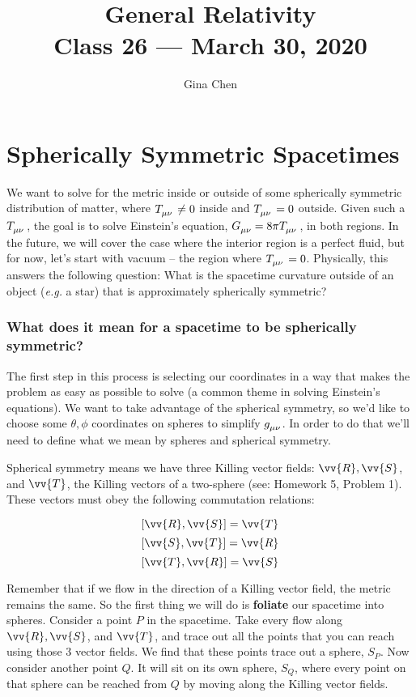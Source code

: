\documentclass[11pt,table]{article}
\title{{\Huge General Relativity}\\{\Large{Class 26 --- March 30, 2020}}} %
\author{Gina Chen}
\begin{document}
\maketitle
\flushbottom
\newpage
\pagestyle{fancynotes}

\part{Spherically Symmetric Spacetimes}

We want to solve for the metric inside or outside of some spherically symmetric distribution of matter, where $\tensor{T}{_\mu_\nu} \neq 0$ inside and $\tensor{T}{_\mu_\nu} = 0$ outside. Given such a $\tensor{T}{_\mu_\nu}$, the goal is to solve Einstein's equation, $\tensor{G}{_\mu_\nu} = 8\pi \tensor{T}{_\mu_\nu}$, in both regions.
In the future, we will cover the case where the interior region is a perfect fluid, but for now, let's start with vacuum -- the region where $\tensor{T}{_\mu_\nu} = 0$. Physically, this answers the following question: What is the spacetime curvature outside of an object (\textit{e.g.} a star) that is approximately spherically symmetric?

\section{What does it mean for a spacetime to be spherically symmetric?}

The first step in this process is selecting our coordinates in a way that makes the problem as easy as possible to solve (a common theme in solving Einstein's equations). We want to take advantage of the spherical symmetry, so we'd like to choose some $\theta, \phi$ coordinates on spheres to simplify $\tensor{g}{_\mu_\nu}$. In order to do that we'll need to define what we mean by spheres and spherical symmetry.

Spherical symmetry means we have three Killing vector fields: $\vv{R}, \vv{S}$, and $\vv{T}$, the Killing vectors of a two-sphere (see: Homework 5, Problem 1). These vectors must obey the following commutation relations:

\[ [\vv{R},\vv{S}] = \vv{T} \]
\[ [\vv{S},\vv{T}] = \vv{R} \]
\[ [\vv{T},\vv{R}] = \vv{S} \]

Remember that if we flow in the direction of a Killing vector field, the metric remains the same. So the first thing we will do is \textbf{foliate} our spacetime into spheres. Consider a point $P$ in the spacetime. Take every flow along $\vv{R}, \vv{S}$, and $\vv{T}$, and trace out all the points that you can reach using those 3 vector fields. We find that these points trace out a sphere, $S_P$. Now consider another point $Q$. It will sit on its own sphere, $S_Q$, where every point on that sphere can be reached from $Q$ by moving along the Killing vector fields.
\end{document}
